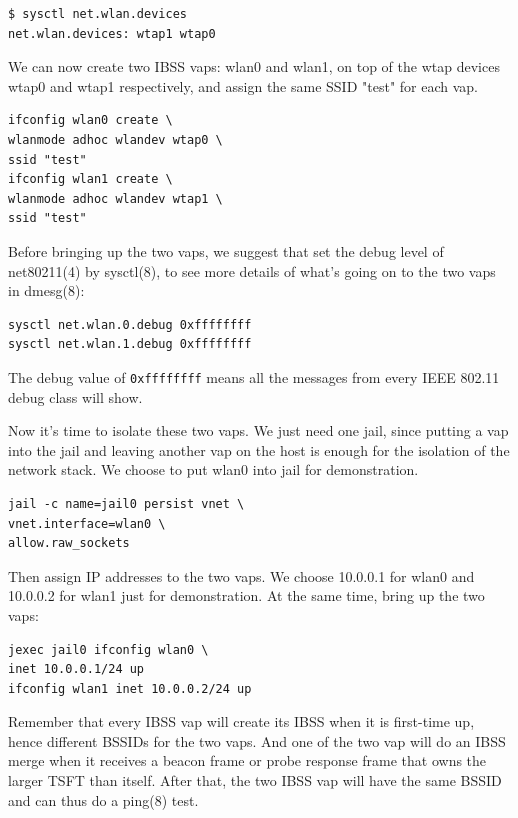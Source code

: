 \documentclass[conference]{IEEEtran}
\begin{document}
\begin{lstlisting}[caption=Show wtap devices, label={lst:sysctl}]
$ sysctl net.wlan.devices
net.wlan.devices: wtap1 wtap0
\end{lstlisting}

We can now create two IBSS vaps: wlan0 and wlan1, on top of the wtap devices wtap0 and wtap1 respectively, and assign the same SSID "test" for each vap.

\begin{lstlisting}
ifconfig wlan0 create \
wlanmode adhoc wlandev wtap0 \
ssid "test"
ifconfig wlan1 create \
wlanmode adhoc wlandev wtap1 \
ssid "test"
\end{lstlisting}

Before bringing up the two vaps, we suggest that set the debug level of net80211(4) by sysctl(8), to see more details of what's going on to the two vaps in dmesg(8):

\begin{lstlisting}[caption=Debug level, label={lst:debug}]
sysctl net.wlan.0.debug 0xffffffff
sysctl net.wlan.1.debug 0xffffffff
\end{lstlisting}

The debug value of \lstinline{0xffffffff} means all the messages from every IEEE 802.11 debug class will show.

Now it's time to isolate these two vaps. We just need one jail, since putting a vap into the jail and leaving another vap on the host is enough for the isolation of the network stack. We choose to put wlan0 into jail for demonstration.

\begin{lstlisting}[caption=Jail, label={lst:jail}]
jail -c name=jail0 persist vnet \
vnet.interface=wlan0 \
allow.raw_sockets
\end{lstlisting}

Then assign IP addresses to the two vaps. We choose 10.0.0.1 for wlan0 and 10.0.0.2 for wlan1 just for demonstration. At the same time, bring up the two vaps:

\begin{lstlisting}[caption=Assign IP address, label={lst:IP}]
jexec jail0 ifconfig wlan0 \
inet 10.0.0.1/24 up
ifconfig wlan1 inet 10.0.0.2/24 up
\end{lstlisting}

Remember that every IBSS vap will create its IBSS when it is first-time up, hence different BSSIDs for the two vaps. And one of the two vap will do an IBSS merge when it receives a beacon frame or probe response frame that owns the larger TSFT than itself. After that, the two IBSS vap will have the same BSSID and can thus do a ping(8) test.
\end{document}
